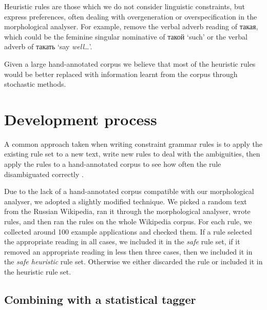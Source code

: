 \documentclass[11pt]{article}
\newcommand{\rus}[1]{\foreignlanguage{russian}{#1}}
\begin{document}



Heuristic rules are those which we do not consider linguistic constraints, but express
preferences, often dealing with overgeneration or overspecification in the morphological
analyser. For example, remove the verbal adverb reading of \rus{такая}, which could be 
the feminine singular nominative of \rus{такой} `such' or the verbal adverb 
of \rus{такать} `say \emph{well}\ldots'.


Given a large hand-annotated corpus we believe that most of the heuristic rules would be 
better replaced with information learnt from the corpus through stochastic methods. 



\section{Development process}

A common approach taken when writing constraint grammar rules is to 
apply the existing rule set to a new text, write new rules to deal with the 
ambiguities, then apply the rules to a hand-annotated corpus to see
how often the rule disambiguated correctly \cite{voutilainen99}.

Due to the lack of a hand-annotated corpus compatible with our morphological
analyser, we adopted a slightly modified technique. We picked a random text
from the Russian Wikipedia, ran it through the morphological analyser, wrote 
rules, and then ran the rules on the whole Wikipedia corpus. For each rule,
we collected around 100 example applications and checked them. If a rule
selected the appropriate reading in all cases, we included it in the \emph{safe}
rule set, if it removed an appropriate reading in less then three cases, 
then we included it in the \emph{safe heuristic} rule set. Otherwise we either
discarded the rule or included it in the heuristic rule set.

\subsection{Combining with a statistical tagger}
\end{document}
